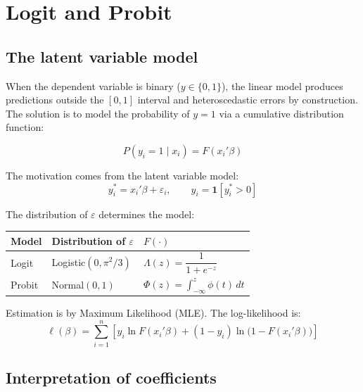 \chapter{Logit and Probit}
\label{cap:logit}

\section{The latent variable model}

When the dependent variable is binary ($y \in \{0,1\}$), the linear model
produces predictions outside the $[0,1]$ interval and heteroscedastic errors by
construction. The solution is to model the probability of $y=1$ via a
cumulative distribution function:

\[
  P(y_i = 1 \mid x_i) = F(x_i'\beta)
\]

The motivation comes from the latent variable model:
\[
  y_i^* = x_i'\beta + \varepsilon_i, \qquad y_i = \mathbf{1}[y_i^* > 0]
\]

The distribution of $\varepsilon$ determines the model:

\begin{center}
\begin{tabular}{lll}
\toprule
\textbf{Model} & \textbf{Distribution of $\varepsilon$} & \textbf{$F(\cdot)$} \\
\midrule
Logit  & Logistic$(0, \pi^2/3)$ & $\Lambda(z) = \dfrac{1}{1 + e^{-z}}$ \\[8pt]
Probit & Normal$(0, 1)$          & $\Phi(z) = \displaystyle\int_{-\infty}^{z} \phi(t)\,dt$ \\
\bottomrule
\end{tabular}
\end{center}

Estimation is by Maximum Likelihood (MLE). The log-likelihood is:
\[
  \ell(\beta) = \sum_{i=1}^{n}
    \left[y_i \ln F(x_i'\beta) + (1-y_i)\ln\bigl(1 - F(x_i'\beta)\bigr)\right]
\]

\section{Interpretation of coefficients}

